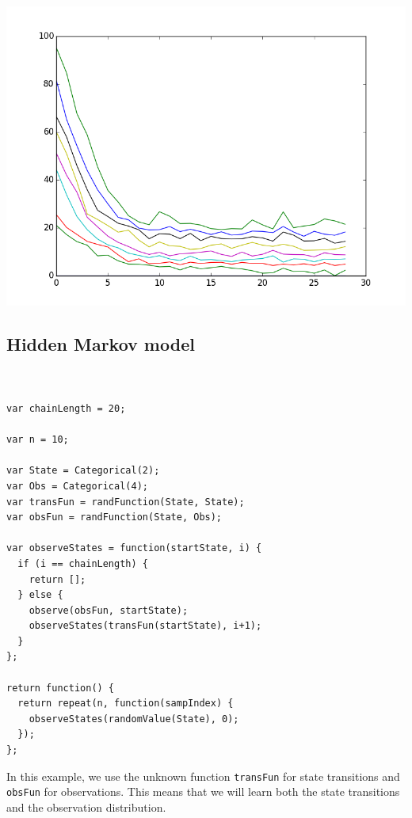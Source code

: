 \documentclass{article}
\begin{document}
\begin{center}
  \includegraphics[scale=0.5]{../plots/accuracy_factor_analysis.png}
\end{center}

  \subsection{Hidden Markov model}
{\small
\begin{lstlisting}


var chainLength = 20;

var n = 10;

var State = Categorical(2);
var Obs = Categorical(4);
var transFun = randFunction(State, State);
var obsFun = randFunction(State, Obs);

var observeStates = function(startState, i) {
  if (i == chainLength) {
    return [];
  } else {
    observe(obsFun, startState);
    observeStates(transFun(startState), i+1);
  }
};

return function() {
  return repeat(n, function(sampIndex) {
    observeStates(randomValue(State), 0);
  });
};
\end{lstlisting}
}

In this example, we use the unknown function \texttt{transFun} for state transitions and \texttt{obsFun} for observations.  This means that we will learn both the state transitions and the observation distribution.
\end{document}
